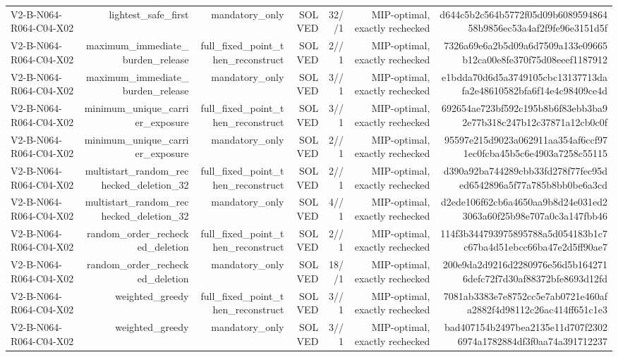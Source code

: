 {\begin{longtable}{lrrrrrr}
V2-B-N064-R064-C04-X02 & lightest\_safe\_first & mandatory\_only & SOLVED & 32//1 & MIP-optimal, exactly rechecked & d644c5b2c564b5772f05d09b608959486458b9856ec53a4af2f9fe96e3151d5f \\
V2-B-N064-R064-C04-X02 & maximum\_immediate\_burden\_release & full\_fixed\_point\_then\_reconstruct & SOLVED & 2//1 & MIP-optimal, exactly rechecked & 7326a69e6a2b5d09a6d7509a133e09665b12ca00e8fe370f75d08eeef1187912 \\
V2-B-N064-R064-C04-X02 & maximum\_immediate\_burden\_release & mandatory\_only & SOLVED & 3//1 & MIP-optimal, exactly rechecked & e1bdda70d6d5a3749105cbc13137713dafa2e48610582bfa6f14e4c98409ce4d \\
V2-B-N064-R064-C04-X02 & minimum\_unique\_carrier\_exposure & full\_fixed\_point\_then\_reconstruct & SOLVED & 3//1 & MIP-optimal, exactly rechecked & 692654ae723bf592c195b8b6f83ebb3ba92e77b318c247b12c37871a12cb0c0f \\
V2-B-N064-R064-C04-X02 & minimum\_unique\_carrier\_exposure & mandatory\_only & SOLVED & 2//1 & MIP-optimal, exactly rechecked & 95597e215d9023a062911aa354af6ccf971ec0fcba45b5c6e4903a7258c55115 \\
V2-B-N064-R064-C04-X02 & multistart\_random\_rechecked\_deletion\_32 & full\_fixed\_point\_then\_reconstruct & SOLVED & 2//1 & MIP-optimal, exactly rechecked & d390a92ba744289cbb33fd278f77fec95ded6542896a5f77a785b8bb0be6a3cd \\
V2-B-N064-R064-C04-X02 & multistart\_random\_rechecked\_deletion\_32 & mandatory\_only & SOLVED & 4//1 & MIP-optimal, exactly rechecked & d2ede106f62cb6a4650aa9b8d24e031ed23063a60f25b98e707a0c3a147fbb46 \\
V2-B-N064-R064-C04-X02 & random\_order\_rechecked\_deletion & full\_fixed\_point\_then\_reconstruct & SOLVED & 2//1 & MIP-optimal, exactly rechecked & 114f3b344793975895788a5d054183b1c7c67ba4d51ebcc66ba47e2d5ff90ae7 \\
V2-B-N064-R064-C04-X02 & random\_order\_rechecked\_deletion & mandatory\_only & SOLVED & 18//1 & MIP-optimal, exactly rechecked & 200e9da2d9216d2280976e56d5b1642716defc72f7d30af88372bfe8693d12fd \\
V2-B-N064-R064-C04-X02 & weighted\_greedy & full\_fixed\_point\_then\_reconstruct & SOLVED & 3//1 & MIP-optimal, exactly rechecked & 7081ab3383e7e8752cc5e7ab0721e460afa2882f4d98112c26ac414ff651c1e3 \\
V2-B-N064-R064-C04-X02 & weighted\_greedy & mandatory\_only & SOLVED & 3//1 & MIP-optimal, exactly rechecked & bad407154b2497bea2135e11d707f23026974a1782884df3f0aa74a391712237 \\

\end{longtable}}
